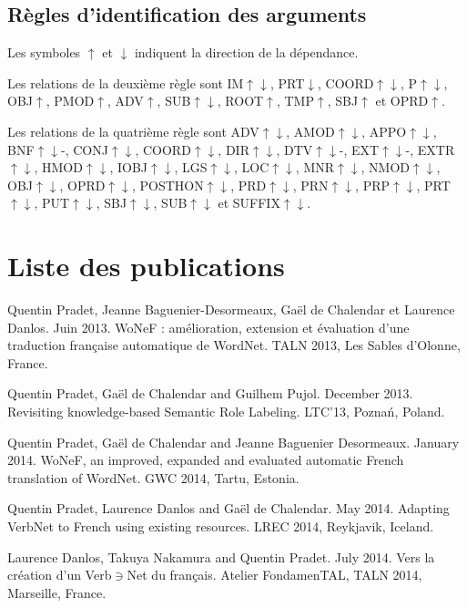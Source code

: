\documentclass[oneside,parskip]{scrbook}
\begin{document}
\section{Règles d'identification des arguments}
\label{argument_identification}

Les symboles $\uparrow$ et $\downarrow$ indiquent la direction de la
dépendance.

Les relations de la deuxième règle sont IM$\uparrow\downarrow$,
PRT$\downarrow$, COORD$\uparrow\downarrow$, P$\uparrow\downarrow$,
OBJ$\uparrow$, PMOD$\uparrow$, ADV$\uparrow$, SUB$\uparrow\downarrow$,
ROOT$\uparrow$, TMP$\uparrow$, SBJ$\uparrow$ et OPRD$\uparrow$.

Les relations de la quatrième règle sont ADV$\uparrow\downarrow$,
AMOD$\uparrow\downarrow$, APPO$\uparrow\downarrow$, BNF$\uparrow\downarrow$-,
CONJ$\uparrow\downarrow$, COORD$\uparrow\downarrow$, DIR$\uparrow\downarrow$,
DTV$\uparrow\downarrow$-, EXT$\uparrow\downarrow$-, EXTR$\uparrow\downarrow$,
HMOD$\uparrow\downarrow$, IOBJ$\uparrow\downarrow$, LGS$\uparrow\downarrow$,
LOC$\uparrow\downarrow$, MNR$\uparrow\downarrow$, NMOD$\uparrow\downarrow$,
OBJ$\uparrow\downarrow$, OPRD$\uparrow\downarrow$, POSTHON$\uparrow\downarrow$,
PRD$\uparrow\downarrow$, PRN$\uparrow\downarrow$, PRP$\uparrow\downarrow$,
PRT$\uparrow\downarrow$, PUT$\uparrow\downarrow$, SBJ$\uparrow\downarrow$,
SUB$\uparrow\downarrow$ et SUFFIX$\uparrow\downarrow$.

\fi

\chapter{Liste des publications}

Quentin Pradet, Jeanne Baguenier-Desormeaux, Gaël de Chalendar et Laurence Danlos. Juin 2013. WoNeF : amélioration, extension et évaluation d’une traduction française automatique de WordNet. TALN 2013, Les Sables d'Olonne, France.

Quentin Pradet, Gaël de Chalendar and Guilhem Pujol. December 2013. Revisiting knowledge-based Semantic Role Labeling. LTC'13, Poznań, Poland.

Quentin Pradet, Gaël de Chalendar and Jeanne Baguenier Desormeaux. January 2014. WoNeF, an improved, expanded and evaluated automatic French translation of WordNet. GWC 2014, Tartu, Estonia.

Quentin Pradet, Laurence Danlos and Gaël de Chalendar. May 2014. Adapting VerbNet to French using existing resources. LREC 2014, Reykjavik, Iceland.

Laurence Danlos, Takuya Nakamura and Quentin Pradet. July 2014. Vers la création d’un Verb$\ni$Net du français. Atelier FondamenTAL, TALN 2014, Marseille, France.


\end{document}
